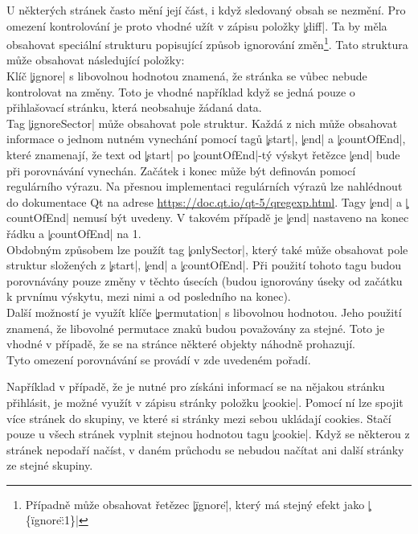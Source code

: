 U některých stránek často mění její část, i když sledovaný obsah se nezmění.
Pro omezení kontrolování je proto vhodné užít v zápisu položky \c|diff|.
Ta by měla obsahovat speciální strukturu  popisující způsob ignorování změn\footnote{Případně může obsahovat řetězec \c|\"ignore\"|, který má stejný efekt jako \c|\{\"ignore\":1\}|}.
Tato struktura může obsahovat následující položky:\\
Klíč \c|ignore| s libovolnou hodnotou znamená, že stránka se vůbec nebude kontrolovat na změny.
Toto je vhodné například když se jedná pouze o přihlašovací stránku, která neobsahuje žádaná data.\\
Tag \c|ignoreSector| může obsahovat pole struktur.
Každá z nich může obsahovat informace o jednom nutném vynechání pomocí tagů \c|start|, \c|end| a \c|countOfEnd|,
které znamenají, že text od \c|start| po \c|countOfEnd|-tý výskyt řetězce \c|end| bude při porovnávání vynechán.
Začátek i konec může být definován pomocí regulárního výrazu.
Na přesnou implementaci regulárních výrazů lze nahlédnout do dokumentace Qt na adrese
\url{https://doc.qt.io/qt-5/qregexp.html}.
Tagy \c|end| a \c|countOfEnd| nemusí být uvedeny. V takovém případě je \c|end| nastaveno na konec řádku a \c|countOfEnd| na 1.
\\
Obdobným způsobem lze použít tag \c|onlySector|, který také může obsahovat pole struktur složených z \c|start|, \c|end| a \c|countOfEnd|.
Při použití tohoto tagu budou porovnávány pouze změny v těchto úsecích (budou ignorovány úseky od začátku k prvnímu výskytu, mezi nimi a od posledního na konec).
\\
Další možností je využít klíče \c|permutation| s libovolnou hodnotou.
Jeho použití znamená, že libovolné permutace znaků budou považovány za stejné.
Toto je vhodné v případě, že se na stránce některé objekty náhodně prohazují.
\\
Tyto omezení porovnávání se provádí v zde uvedeném pořadí.




Například v případě, že je nutné pro získáni informací se na nějakou stránku přihlásit, je možné využít v zápisu stránky položku \c|cookie|.
Pomocí ní lze spojit více stránek do skupiny, ve které si stránky mezi sebou ukládají cookies.
Stačí pouze u všech stránek vyplnit stejnou hodnotou tagu \c|cookie|.
Když se některou z stránek nepodaří načíst, v daném průchodu se nebudou načítat ani další stránky ze stejné skupiny.
